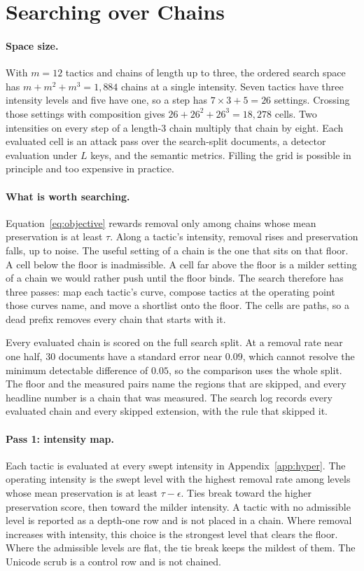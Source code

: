 \section{Searching over Chains}
\label{sec:search}

\paragraph{Space size.}
With $m = 12$ tactics and chains of length up to three, the ordered search space has $m + m^2 + m^3 = 1{,}884$ chains at a single intensity. Seven tactics have three intensity levels and five have one, so a step has $7 \times 3 + 5 = 26$ settings. Crossing those settings with composition gives $26 + 26^2 + 26^3 = 18{,}278$ cells. Two intensities on every step of a length-3 chain multiply that chain by eight. Each evaluated cell is an attack pass over the search-split documents, a detector evaluation under $L$ keys, and the semantic metrics. Filling the grid is possible in principle and too expensive in practice.

\paragraph{What is worth searching.}
Equation~\ref{eq:objective} rewards removal only among chains whose mean preservation is at least $\tau$. Along a tactic's intensity, removal rises and preservation falls, up to noise. The useful setting of a chain is the one that sits on that floor. A cell below the floor is inadmissible. A cell far above the floor is a milder setting of a chain we would rather push until the floor binds. The search therefore has three passes: map each tactic's curve, compose tactics at the operating point those curves name, and move a shortlist onto the floor. The cells are paths, so a dead prefix removes every chain that starts with it.

Every evaluated chain is scored on the full search split. At a removal rate near one half, $30$ documents have a standard error near $0.09$, which cannot resolve the minimum detectable difference of $0.05$, so the comparison uses the whole split. The floor and the measured pairs name the regions that are skipped, and every headline number is a chain that was measured. The search log records every evaluated chain and every skipped extension, with the rule that skipped it.

\paragraph{Pass 1: intensity map.}
Each tactic is evaluated at every swept intensity in Appendix~\ref{app:hyper}. The operating intensity is the swept level with the highest removal rate among levels whose mean preservation is at least $\tau - \epsilon$. Ties break toward the higher preservation score, then toward the milder intensity. A tactic with no admissible level is reported as a depth-one row and is not placed in a chain. Where removal increases with intensity, this choice is the strongest level that clears the floor. Where the admissible levels are flat, the tie break keeps the mildest of them. The Unicode scrub is a control row and is not chained.

